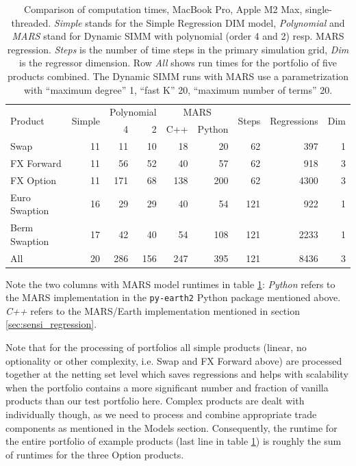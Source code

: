 \documentclass[11pt,a4paper,oneside]{article}
\begin{document}
\begin{table}[hbt]
\scriptsize
\begin{tabular}{|l|r|rr|rr|r|r|r|}
  \hline
  \multirow{2}{*}{Product}  & \multirow{2}{*}{Simple} & \multicolumn{2}{c|}{Polynomial} & \multicolumn{2}{c|}{MARS} & \multirow{2}{*}{Steps} & \multirow{2}{*}{Regressions} & \multirow{2}{*}{Dim} \\
  & & 4 & 2 & C++ & Python & & &\\
  \hline
  \hline
  Swap          & 11  &  11  &  10  &  18  &   20 &  62  &   397  & 1 \\ 
  \hline
  FX Forward    & 11  &  56  &  52  &  40  &   57 &  62  &   918  & 3 \\ 
  \hline
  FX Option     & 11  & 171  &  68  & 138  &  200 &  62  &  4300  & 3 \\ 
  \hline
  Euro Swaption & 16  &  29  &  29  &  40  &   54 & 121  &   922  & 1 \\  
  \hline
  Berm Swaption & 17  &  42  &  40  &  54  &  108 & 121  &  2233  & 1  \\ 
  \hline
  All           & 20  & 286  & 156  & 247  &  395 & 121  &  8436  & 3  \\
  \hline
\end{tabular}
\caption{Comparison of computation times, MacBook Pro, Apple M2 Max, single-threaded. {\em Simple} stands for the Simple Regression DIM model,
  {\em Polynomial} and {\em MARS} stand for Dynamic SIMM with polynomial (order 4 and 2) resp. MARS regression. {\em Steps} is the number of time steps in the primary
  simulation grid, {\em Dim} is the regressor dimension. Row {\em All} shows run times for the portfolio of five products combined.
  The Dynamic SIMM runs with MARS use a parametrization with ``maximum degree'' 1, ``fast K'' 20, ``maximum number of terms'' 20.}
\label{tab:performance}
\end{table}

Note the two columns with MARS model runtimes in table \ref{tab:performance}: {\em Python} refers to the MARS implementation
in the {\tt py-earth2} Python package mentioned above. {\em C++} refers to the MARS/Earth implementation mentioned in section \ref{sec:sensi_regression}.

Note that for the processing of portfolios all simple products (linear, no optionality or other complexity, i.e. Swap and FX Forward above) are processed
together at the netting set level which saves regressions and helps with scalability when the portfolio contains a more significant number and fraction of
vanilla products than our test portfolio here.
Complex products are dealt with individually though, as we need to process and combine appropriate trade components as mentioned in the Models section.
Consequently, the runtime for the entire portfolio of example products (last line in table \ref{tab:performance}) is roughly the sum of runtimes for the
three Option products.
\end{document}
